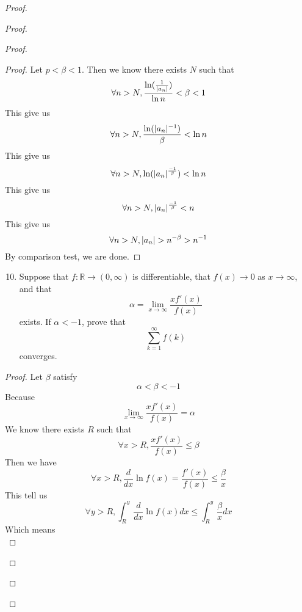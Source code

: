 \documentclass{report}
\begin{document}
\begin{proof}
\begin{proof}
\begin{proof}
\begin{proof}
Let $p<\beta <1$. Then we know there exists $N$ such that
\begin{equation}
\forall n>N, \frac{\ln (\frac{1}{|a_n|})}{\ln n}<\beta <1
\end{equation}
This give us
\begin{equation}
  \forall n>N, \frac{\ln(|a_n|^{-1})}{\beta }<\ln n
\end{equation}
This give us
\begin{equation}
\forall n>N, \ln(|a_n|^{\frac{-1}{\beta }})<\ln n 
\end{equation}
This give us
\begin{equation}
\forall n>N, |a_n|^{\frac{-1}{\beta }}<n
\end{equation}
This give us
\begin{equation}
\forall n>N, \abso{a_n}>n^{-\beta }>n^{-1}
\end{equation}
By comparison test, we are done.
\end{proof}
\begin{question}{}{}
\begin{enumerate}
    \setcounter{enumi}{9}
    \item Suppose that \( f : \mathbb{R} \to (0,\infty) \) is differentiable, that \( f(x) \to 0 \) as \( x \to \infty \), and that
    \[
    \alpha = \lim_{{x \to \infty}} \frac{xf'(x)}{f(x)}
    \]
    exists. If \( \alpha < -1 \), prove that
    \[
    \sum_{k=1}^{\infty} f(k)
    \]
    converges.
\end{enumerate}
\end{question}
\begin{proof}
Let $\beta $ satisfy
\begin{equation}
\alpha<\beta <-1 
\end{equation}
Because
\begin{equation}
\lim_{x\to\infty}\frac{xf'(x)}{f(x)}=\alpha 
\end{equation}
We know there exists $R$ such that
\begin{equation}
\forall x>R, \frac{xf'(x)}{f(x)}\leq \beta 
\end{equation}
Then we have
\begin{equation}
\forall x>R, \frac{d}{dx}\ln f(x)=\frac{f'(x)}{f(x)}\leq \frac{\beta }{x}
\end{equation}
This tell us 
\begin{equation}
  \forall y>R, \int^y_R \frac{d}{dx}\ln f(x)dx\leq \int^y_R \frac{\beta}{x}dx
\end{equation}
Which means
\begin{equation}

\end{equation}
\end{proof}
\end{proof}
\end{proof}
\end{proof}
\end{document}
